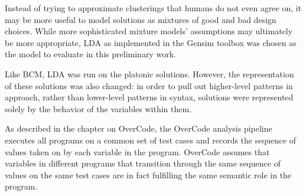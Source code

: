 Instead of trying to approximate clusterings that humans do not even agree on, it may be more useful to model solutions as mixtures of good and bad design choices. While more sophisticated mixture models' assumptions may ultimately be more appropriate, LDA \cite{lda} as implemented in the Gensim toolbox \cite{gensim} was chosen as the model to evaluate in this preliminary work. 

Like BCM, LDA was run on the platonic solutions. However, the representation of these solutions was also changed: in order to pull out higher-level patterns in approach, rather than lower-level patterns in syntax, solutions were represented solely by the behavior of the variables within them. 

As described in the chapter on OverCode, the OverCode analysis pipeline executes all programs on a common set of test cases and records the sequence of values taken on by each variable in the program. OverCode assumes that variables in different programs that transition through the same sequence of values on the same test cases are in fact fulfilling the same semantic role in the program. %



